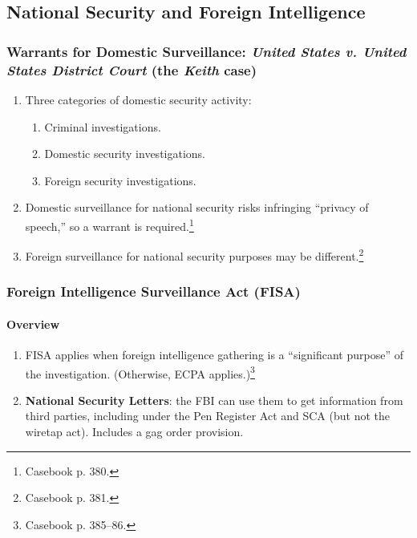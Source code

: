\subsection{National Security and Foreign Intelligence}

\subsubsection{Warrants for Domestic Surveillance: \emph{United States v. 
United States District Court} (the \emph{Keith} case)}

\begin{enumerate}
    \item Three categories of domestic security activity:
    \begin{enumerate}
        \item Criminal investigations.
        \item Domestic security investigations.
        \item Foreign security investigations.
    \end{enumerate}
    \item Domestic surveillance for national security risks infringing 
    ``privacy of speech,'' so a warrant is required.\footnote{Casebook p. 
    380.}
    \item Foreign surveillance for national security purposes may be 
    different.\footnote{Casebook p. 381.}
\end{enumerate}

\subsubsection{Foreign Intelligence Surveillance Act (FISA)}

\paragraph{Overview}

\begin{enumerate}
    \item FISA applies when foreign intelligence gathering is a ``significant 
    purpose'' of the investigation. (Otherwise, ECPA 
    applies.)\footnote{Casebook p. 385--86.}
    \item \textbf{National Security Letters}: the FBI can use them to get 
    information from third parties, including under the Pen Register Act and 
    SCA (but not the wiretap act). Includes a gag order provision.
\end{enumerate}

